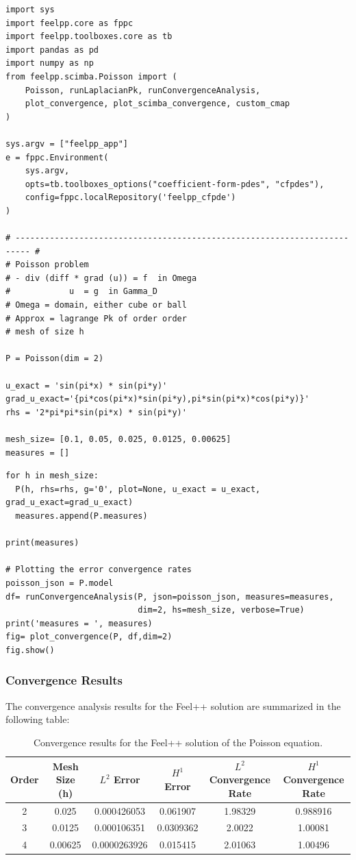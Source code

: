 \documentclass{article}
\begin{document}
\begin{verbatim}
import sys
import feelpp.core as fppc
import feelpp.toolboxes.core as tb
import pandas as pd
import numpy as np
from feelpp.scimba.Poisson import (
    Poisson, runLaplacianPk, runConvergenceAnalysis,
    plot_convergence, plot_scimba_convergence, custom_cmap
)

sys.argv = ["feelpp_app"]
e = fppc.Environment(
    sys.argv,
    opts=tb.toolboxes_options("coefficient-form-pdes", "cfpdes"),
    config=fppc.localRepository('feelpp_cfpde')
)

# ------------------------------------------------------------------------- #
# Poisson problem
# - div (diff * grad (u)) = f  in Omega
#            u  = g  in Gamma_D
# Omega = domain, either cube or ball
# Approx = lagrange Pk of order order
# mesh of size h

P = Poisson(dim = 2)

u_exact = 'sin(pi*x) * sin(pi*y)'
grad_u_exact='{pi*cos(pi*x)*sin(pi*y),pi*sin(pi*x)*cos(pi*y)}'
rhs = '2*pi*pi*sin(pi*x) * sin(pi*y)'

mesh_size= [0.1, 0.05, 0.025, 0.0125, 0.00625]
measures = []
\end{verbatim}

\begin{verbatim}
for h in mesh_size:
  P(h, rhs=rhs, g='0', plot=None, u_exact = u_exact, grad_u_exact=grad_u_exact)
  measures.append(P.measures)

print(measures)

# Plotting the error convergence rates
poisson_json = P.model
df= runConvergenceAnalysis(P, json=poisson_json, measures=measures,
                           dim=2, hs=mesh_size, verbose=True)
print('measures = ', measures)
fig= plot_convergence(P, df,dim=2)
fig.show()
\end{verbatim}

\subsubsection{Convergence Results}

The convergence analysis results for the Feel++ solution are summarized in the following table:

\begin{table}[h!]
    \centering
    \begin{tabular}{c c c c c c}
        \textbf{Order} & \textbf{Mesh Size (h)} & \textbf{$L^{2}$ Error} & \textbf{$H^{1}$ Error} & \textbf{$L^{2}$ Convergence Rate} & \textbf{$H^{1}$ Convergence Rate} \\
\toprule
        2 & 0.025 & 0.000426053 & 0.061907 & 1.98329 & 0.988916 \\
        3 & 0.0125 & 0.000106351 & 0.0309362 & 2.0022 & 1.00081 \\
        4 & 0.00625 & 0.0000263926 & 0.015415 & 2.01063 & 1.00496 \\
\bottomrule
    \end{tabular}
    \caption{Convergence results for the Feel++ solution of the Poisson equation.}
    \label{tab:feelpp_convergence}
\end{table}
\end{document}
